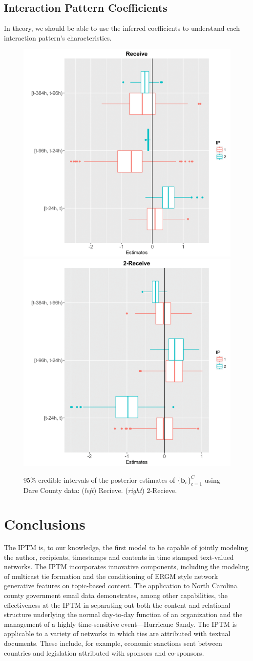 \documentclass{article}
\begin{document}
\subsection{Interaction Pattern Coefficients}\label{subsec:Interaction Pattern Coefficients}
In theory, we should be able to use the inferred coefficients to
understand each interaction pattern's characteristics.
\begin{figure}[h]
	\centering
	\includegraphics[width=.235\textwidth]{plots/receive-1.png} \includegraphics[width=.235\textwidth]{plots/2receive-1.png}
	\caption{95\% credible intervals of the posterior estimates of $\{\boldsymbol{b}_c\}_{c=1}^C$ using Dare County data: (\textit{left}) Recieve. (\textit{right}) 2-Recieve. }
	\label{fig:b}
\end{figure}
\section{Conclusions}\label{sec:Conclusions}
The IPTM is, to our knowledge, the first model to be capable of jointly modeling the author, recipients, timestamps and contents in time stamped text-valued networks. The IPTM incorporates innovative components, including the modeling of multicast tie formation and the conditioning of ERGM style network generative features on topic-based content. The application to North Carolina county government email data demonstrates, among other capabilities, the effectiveness at the IPTM in separating out both the content and relational structure underlying the normal day-to-day function of an organization and the management of a highly time-sensitive event---Hurricane Sandy. The IPTM is applicable to a variety of networks in which ties are attributed with textual documents. These include, for example, economic sanctions sent between countries and legislation attributed with sponsors and co-sponsors. 
\end{document}

